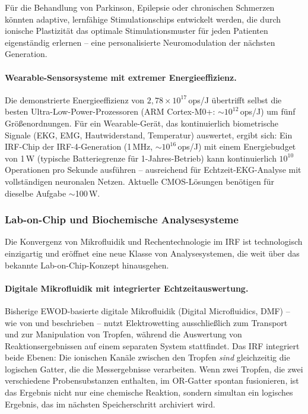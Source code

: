 ﻿\documentclass[a4paper,12pt]{scrreprt}
\theoremstyle{definition}
\begin{document}
Für die Behandlung von Parkinson, Epilepsie oder chronischen Schmerzen
könnten adaptive, lernfähige Stimulationschips entwickelt werden, die
durch ionische Plastizität das optimale Stimulationsmuster für jeden
Patienten eigenständig erlernen -- eine personalisierte Neuromodulation
der nächsten Generation.

\paragraph{Wearable-Sensorsysteme mit extremer Energieeffizienz.}
Die demonstrierte Energieeffizienz von $2{,}78 \times 10^{17}$\,ops/J übertrifft
selbst die besten Ultra-Low-Power-Prozessoren (ARM Cortex-M0+:
$\sim 10^{12}$\,ops/J) um fünf Größenordnungen. Für ein Wearable-Gerät,
das kontinuierlich biometrische Signale (EKG, EMG, Hautwiderstand, Temperatur)
auswertet, ergibt sich: Ein IRF-Chip der IRF-4-Generation (1\,MHz,
$\sim 10^{16}$\,ops/J) mit einem Energiebudget von 1\,\textmu W (typische
Batteriegrenze für 1-Jahres-Betrieb) kann kontinuierlich
$10^{10}$ Operationen pro Sekunde ausführen -- ausreichend für Echtzeit-EKG-Analyse
mit vollständigen neuronalen Netzen. Aktuelle CMOS-Lösungen benötigen
für dieselbe Aufgabe $\sim$100\,\textmu W.

\subsubsection{Lab-on-Chip und Biochemische Analysesysteme}
\label{subsubsec:lab_on_chip}

Die Konvergenz von Mikrofluidik und Rechentechnologie im IRF ist technologisch
einzigartig und eröffnet eine neue Klasse von Analysesystemen, die weit
über das bekannte Lab-on-Chip-Konzept hinausgehen.

\paragraph{Digitale Mikrofluidik mit integrierter Echtzeitauswertung.}
Bisherige EWOD-basierte digitale Mikrofluidik (Digital Microfluidics, DMF)
-- wie von \cite{cho2003} und \cite{fair2007} beschrieben --
nutzt Elektrowetting ausschließlich zum Transport und zur Manipulation von
Tropfen, während die Auswertung von Reaktionsergebnissen auf einem separaten
System stattfindet. Das IRF integriert beide Ebenen: Die ionischen Kanäle
zwischen den Tropfen \emph{sind} gleichzeitig die logischen Gatter, die
die Messergebnisse verarbeiten. Wenn zwei Tropfen, die zwei verschiedene
Probensubstanzen enthalten, im OR-Gatter spontan fusionieren, ist das
Ergebnis nicht nur eine chemische Reaktion, sondern simultan ein
logisches Ergebnis, das im nächsten Speicherschritt archiviert wird.
\end{document}
